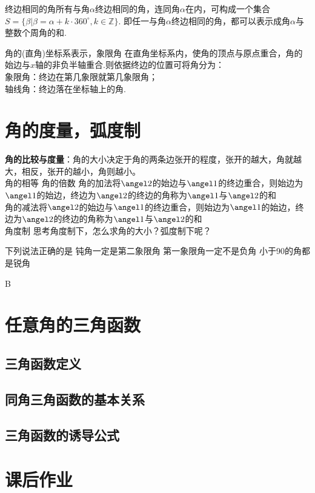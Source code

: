 {终边相同的角}所有与角$\alpha$终边相同的角，连同角$\alpha$在内，可构成一个集合
$S=\{\beta|\beta=\alpha+k\cdot 360^\circ,k\in\mathbb{Z}\}$.%
即任一与角$\alpha$终边相同的角，都可以表示成角$\alpha$与整数个周角的和.
\par
{角的(直角)坐标系表示，象限角}
在直角坐标系内，使角的顶点与原点重合，角的始边与$x$轴的非负半轴重合.则依据终边的位置可将角分为：\\
{\kaishu 象限角}：终边在第几象限就第几象限角；\\
{\kaishu 轴线角}：终边落在坐标轴上的角.\\

\section{角的度量，弧度制}
{\bf 角的比较与度量}：角的大小决定于角的两条边张开的程度，张开的越大，角就越大，相反，张开的越小，角则越小。\\
{角的相等}
{角的倍数}
{角的加法}将$\angel 2$的始边与$\angel 1$的终边重合，则始边为$\angel 1$的始边，终边为$\angel 2$的终边的角称为$\angel 1$与$\angel 2$的和\\
{角的减法}将$\angel 2$的始边与$\angel 1$的终边重合，则始边为$\angel 1$的始边，终边为$\angel 2$的终边的角称为$\angel 1$与$\angel 2$的和\\
{角度制}
{思考}角度制下，怎么求角的大小？弧度制下呢？

\startexercise
\begin{exercise}
\item
下列说法正确的是\xz
{}
{钝角一定是第二象限角}
{第一象限角一定不是负角}
{小于90\textdegree 的角都是锐角}
\begin{answer}B\end{answer}




\end{exercise}
\stopexercise

\section{任意角的三角函数}
\subsection{三角函数定义}
\subsection{同角三角函数的基本关系}
\subsection{三角函数的诱导公式}



\section{课后作业}
